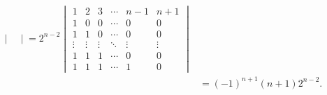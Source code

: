 \documentclass[UTF8,12pt,a4paper,fontset=fandol]{ctexart}
\begin{document}
\begin{solve}
\begin{align*}
\begin{vmatrix}
               \end{vmatrix}=2^{n-2}
        \begin{vmatrix}
            1      & 2      & 3      & \cdots & n-1    & n+1    \\
            1      & 0      & 0      & \cdots & 0      & 0      \\
            1      & 1      & 0      & \cdots & 0      & 0      \\
            \vdots & \vdots & \vdots & \ddots & \vdots & \vdots \\
            1      & 1      & 1      & \cdots & 0      & 0      \\
            1      & 1      & 1      & \cdots & 1      & 0
        \end{vmatrix}                      \\
            & =(-1)^{n+1}(n+1) 2^{n-2}.
    \end{align*}
\end{solve}
\end{document}
